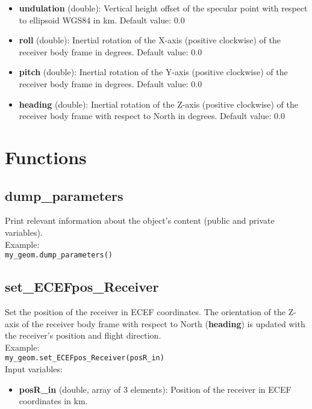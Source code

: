\begin{itemize}
\item {\bf undulation} (double): Vertical height offset of the specular point with respect to ellipsoid WGS84 in km. Default value: 0.0

\item {\bf roll} (double): Inertial rotation of the X-axis (positive clockwise) of the receiver body frame in degrees. Default value: 0.0

\item {\bf pitch} (double): Inertial rotation of the Y-axis (positive clockwise) of the receiver body frame in degrees. Default value: 0.0

\item {\bf heading} (double): Inertial rotation of the Z-axis (positive clockwise) of the receiver body frame with respect to North in degrees. Default value: 0.0
\end{itemize}

\section{Functions}

\subsection{dump\_parameters}

Print relevant information about the object's content (public and private variables).\\

Example:\\

\texttt{my\_geom.dump\_parameters()}\\


\subsection{set\_ECEFpos\_Receiver}

Set the position of the receiver in ECEF coordinates. The orientation of the Z-axis of the receiver body frame with respect to North ({\bf heading}) is updated with the receiver's position and flight direction.\\

Example:\\

\texttt{my\_geom.set\_ECEFpos\_Receiver(posR\_in)}\\

Input variables:
\begin{itemize}
\item {\bf posR\_in} (double, array of 3 elements): Position of the receiver in ECEF coordinates in km.
\end{itemize}

